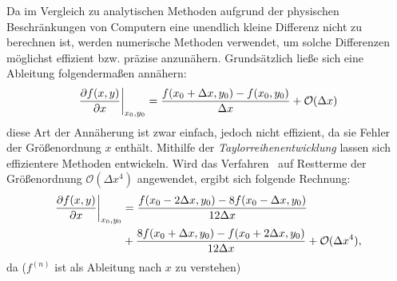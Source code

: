 Da im Vergleich zu analytischen Methoden aufgrund der physischen Beschränkungen von Computern eine unendlich kleine Differenz nicht zu berechnen ist, werden numerische Methoden verwendet, um solche Differenzen möglichst effizient bzw. präzise anzunähern.
Grundsätzlich ließe sich eine Ableitung folgendermaßen annähern:
\begin{align*}
    \left.\frac{\partial f(x,y)}{\partial x}\right\vert_{x_0 , y_0} = \frac{f(x_0 +\Delta x,y_0)-f(x_0,y_0)}{\Delta x} + \mathcal{O}(\Delta x)
\end{align*}
diese Art der Annäherung ist zwar einfach, jedoch nicht effizient, da sie Fehler der Größenordnung $x$ enthält. Mithilfe der \emph{Taylorreihenentwicklung} lassen sich effizientere Methoden entwickeln. Wird das Verfahren~\cite[nach][S. ~51f.]{lecheler_computational_2022} auf Restterme der Größenordnung $\mathcal{O}(\Delta x^4)$ angewendet, ergibt sich folgende Rechnung:
\begin{align}
\label{naeherung4}
\begin{split}
    \left. \frac{\partial f(x,y)}{\partial x} \right\vert_{x_0,y_0} &= \frac{f(x_0-2\Delta x,y_0) - 8 f(x_0 -\Delta x,y_0)}{12\Delta x} \\
    &+ \frac{8f(x_0+\Delta x, y_0) - f(x_0 + 2\Delta x, y_0)}{12\Delta x} + \mathcal{O}(\Delta x^4),
    \end{split}
\end{align}
da ($f^{(n)}$ ist als Ableitung nach $x$ zu verstehen)
